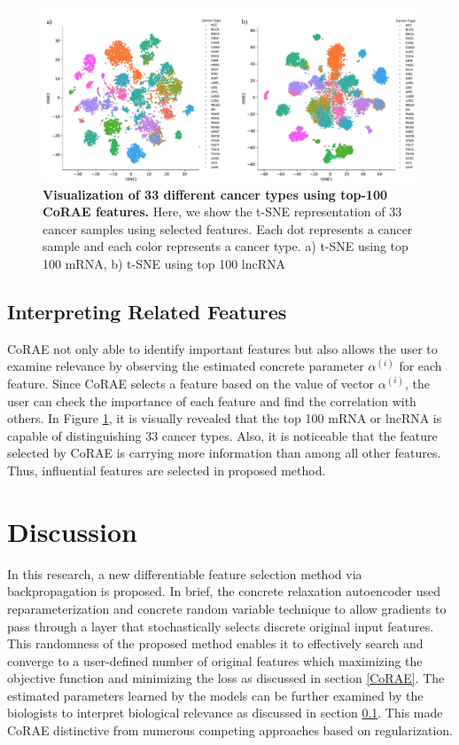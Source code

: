 \documentclass{bioinfo}
\begin{document}
{\begin{figure}[hbt]
    \centering
    \includegraphics[scale=0.45]{fig/tSNE.pdf}
    \caption{\textbf{Visualization of 33 different cancer types using top-100 CoRAE features.} Here, we show the t-SNE representation of 33 cancer samples using selected features. Each dot represents a cancer sample and each color represents a cancer type. a) t-SNE using top 100 mRNA, b) t-SNE using top 100 lncRNA}
    \label{fig:tsne}
\end{figure}


\subsection{Interpreting Related Features} \label{inter}
CoRAE not only able to identify important features but also allows the user to examine relevance by observing the estimated concrete parameter $\alpha^{(i)}$ for each feature. Since CoRAE selects a feature based on the value of vector $\alpha^{(i)}$, the user can check the importance of each feature and find the correlation with others.  In Figure \ref{fig:tsne}, it is visually revealed that the top 100 mRNA or lncRNA is capable of distinguishing 33 cancer types. Also, it is noticeable that the feature selected by CoRAE is carrying more information than among all other features. Thus, influential features are selected in proposed method. 
\section{Discussion}
In this research, a new differentiable feature selection method via backpropagation is proposed. In brief, the concrete relaxation autoencoder used reparameterization and concrete random variable technique to allow gradients to pass through a layer that stochastically selects discrete original input features. This randomness of the proposed method enables it to effectively search and converge to a user-defined number of original features which maximizing the objective function and minimizing the loss as discussed in section \ref{CoRAE}. The estimated parameters learned by the models can be further examined by the biologists to interpret biological relevance as discussed in section \ref{inter}. This made CoRAE distinctive from numerous competing approaches based on regularization. 

}
\end{document}
